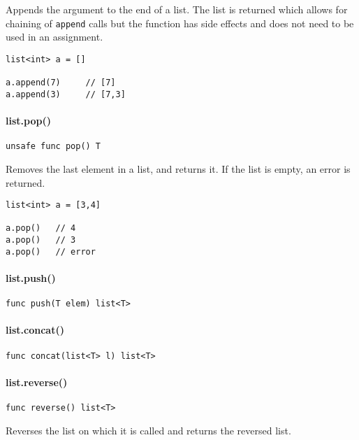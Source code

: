 Appends the argument to the end of a list. The list is returned which
allows for chaining of \texttt{append} calls but the function has side
effects and does not need to be used in an assignment.

\begin{verbatim}
list<int> a = []

a.append(7)     // [7]
a.append(3)     // [7,3]
\end{verbatim}

\paragraph{list.pop()}\label{list.pop}

\begin{verbatim}
unsafe func pop() T
\end{verbatim}

Removes the last element in a list, and returns it. If the list is
empty, an error is returned.

\begin{verbatim}
list<int> a = [3,4]

a.pop()   // 4
a.pop()   // 3
a.pop()   // error
\end{verbatim}

\paragraph{list.push()}\label{list.push}

\begin{verbatim}
func push(T elem) list<T>
\end{verbatim}

\paragraph{list.concat()}\label{list.concat}

\begin{verbatim}
func concat(list<T> l) list<T>
\end{verbatim}

\paragraph{list.reverse()}\label{list.reverse}

\begin{verbatim}
func reverse() list<T>
\end{verbatim}

Reverses the list on which it is called and returns the reversed list.

